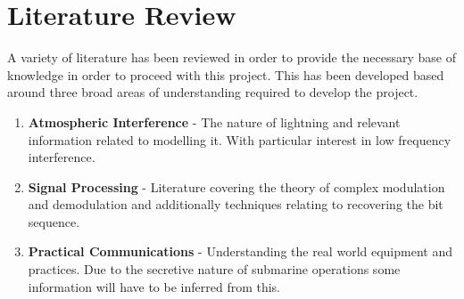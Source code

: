 \chapter{Literature Review}

A variety of literature has been reviewed in order to provide the necessary base of knowledge in order to proceed with this project. This has been developed based around three broad areas of understanding required to develop the project.

\begin{enumerate}[i]
    \item \textbf{Atmospheric Interference} - The nature of lightning and relevant information related to modelling it. With particular interest in low frequency interference.
    \item \textbf{Signal Processing} - Literature covering the theory of complex modulation and demodulation and additionally techniques relating to recovering the bit sequence.
    \item \textbf{Practical Communications} - Understanding the real world equipment and practices. Due to the secretive nature of submarine operations some information will have to be inferred from this.
\end{enumerate}

